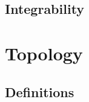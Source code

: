 \hypertarget{integrability-1}{%
\subsection{Integrability}\label{integrability-1}}

\hypertarget{topology-1}{%
\section{Topology}\label{topology-1}}

\hypertarget{definitions-1}{%
\subsection{Definitions}\label{definitions-1}}


